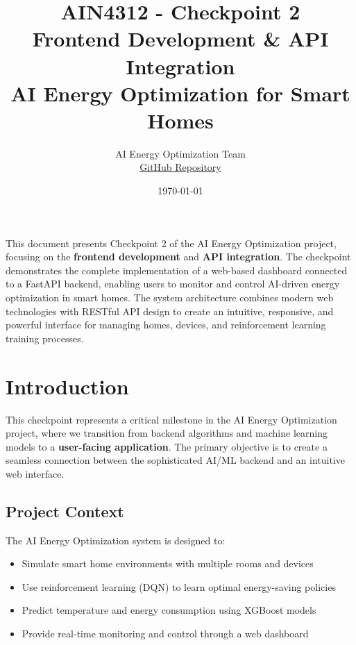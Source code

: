 \documentclass[12pt,a4paper]{article}
\title{
    \vspace{-1cm}
    \huge\textbf{AIN4312 - Checkpoint 2}\\
    \vspace{0.5cm}
    \Large\textbf{Frontend Development \& API Integration}\\
    \vspace{0.3cm}
    \large AI Energy Optimization for Smart Homes\\
    \vspace{0.2cm}
}
\author{
    AI Energy Optimization Team\\
    \small \href{https://github.com/WajeehAlamoudi/AI\_energy\_optimization}{GitHub Repository}
}
\date{\today}
\begin{document}
\maketitle
\thispagestyle{fancy}

\begin{tcolorbox}[colback=primarycolor!5, colframe=primarycolor, title=Executive Summary]
This document presents Checkpoint 2 of the AI Energy Optimization project, focusing on the \textbf{frontend development} and \textbf{API integration}. The checkpoint demonstrates the complete implementation of a web-based dashboard connected to a FastAPI backend, enabling users to monitor and control AI-driven energy optimization in smart homes. The system architecture combines modern web technologies with RESTful API design to create an intuitive, responsive, and powerful interface for managing homes, devices, and reinforcement learning training processes.
\end{tcolorbox}

\vspace{0.5cm}

\tableofcontents
\newpage

\section{Introduction}

This checkpoint represents a critical milestone in the AI Energy Optimization project, where we transition from backend algorithms and machine learning models to a \textbf{user-facing application}. The primary objective is to create a seamless connection between the sophisticated AI/ML backend and an intuitive web interface.

\subsection{Project Context}

The AI Energy Optimization system is designed to:
\begin{itemize}[leftmargin=*]
    \item Simulate smart home environments with multiple rooms and devices
    \item Use reinforcement learning (DQN) to learn optimal energy-saving policies
    \item Predict temperature and energy consumption using XGBoost models
    \item Provide real-time monitoring and control through a web dashboard
\end{itemize}
\end{document}
